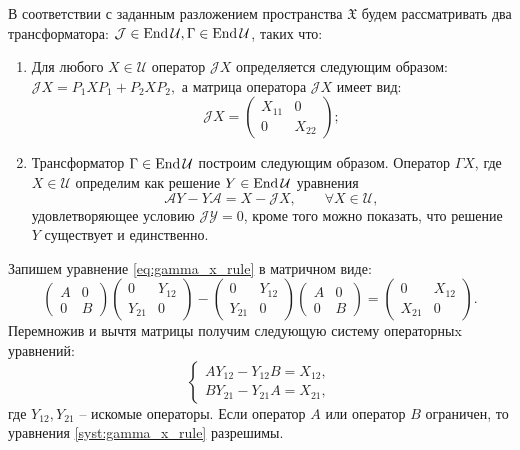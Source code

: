 В соответствии с заданным разложением пространства $\mathfrak{X}$ будем рассматривать два трансформатора: $\mathcal{J} \in \operatorname{End}\mathcal{U}, \Gamma \in \operatorname{End}\mathcal{U}$, таких что:
\begin{enumerate}
	\item Для любого $X \in \mathcal{U}$ оператор $\mathcal{J}X$ определяется следующим образом: $\mathcal{J}X = P_1XP_1 + P_2XP_2,$ а матрица оператора $\mathcal{J}X$ имеет вид:
	$$
	\mathcal{J}X = \begin{pmatrix}
		X_{11} & 0 \\
		0 & X_{22}
	\end{pmatrix};
	$$
	\item Трансформатор $\Gamma \in \operatorname{End}\mathcal{U}$ построим следующим образом. Оператор 
	$\Gamma X$, где $X \in \mathcal{U}$ определим как решение $Y \in \operatorname{End}\mathcal{U}$ уравнения
	\begin{equation}\label{eq:gamma_x_rule}
		\mathcal{A}Y - Y\mathcal{A} = X - \mathcal{J}X,\qquad \forall X \in \mathcal{U},
	\end{equation}
	удовлетворяющее условию $\mathcal{J}\mathcal{Y} = 0$, кроме того можно показать, что решение 
	$Y$ существует и единственно.
\end{enumerate}
Запишем уравнение \eqref{eq:gamma_x_rule} в матричном виде:
$$
\begin{pmatrix}
		A & 0 \\
		0 & B
\end{pmatrix}
\begin{pmatrix}
		0 & Y_{12} \\
		Y_{21} & 0
\end{pmatrix} -
\begin{pmatrix}
		0 & Y_{12} \\
		Y_{21} & 0
\end{pmatrix}
\begin{pmatrix}
		A & 0 \\
		0 & B
\end{pmatrix} =
\begin{pmatrix}
		0 & X_{12} \\
		X_{21} & 0
\end{pmatrix}.	 	
$$
Перемножив и вычтя матрицы получим следующую систему операторныx уравнений:
\begin{equation}\label{syst:gamma_x_rule}
	\begin{cases}
		AY_{12} - Y_{12}B = X_{12}, \\
		BY_{21} - Y_{21}A = X_{21},
	\end{cases}
\end{equation}
где $Y_{12}, Y_{21}$ -- искомые операторы. Если оператор $A$ или оператор $B$ ограничен, то уравнения \eqref{syst:gamma_x_rule} разрешимы.

